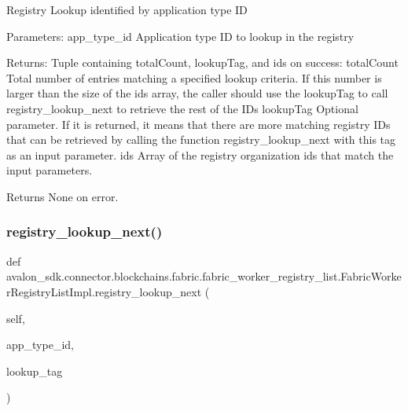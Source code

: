 \begin{DoxyVerb}Registry Lookup identified by application type ID

Parameters:
app_type_id  Application type ID to lookup in the registry

Returns:
Tuple containing totalCount, lookupTag, and ids on success:
totalCount Total number of entries matching a specified lookup
   criteria. If this number is larger than the size of the
   ids array, the caller should use the lookupTag to call
   registry_lookup_next to retrieve the rest of the IDs
lookupTag  Optional parameter. If it is returned, it means that
   there are more matching registry IDs that can be
   retrieved by calling the function registry_lookup_next
   with this tag as an input parameter.
ids        Array of the registry organization ids that match the
   input parameters.

Returns None on error.
\end{DoxyVerb}
 \mbox{\label{classavalon__sdk_1_1connector_1_1blockchains_1_1fabric_1_1fabric__worker__registry__list_1_1FabricWorkerRegistryListImpl_ace64bb5dd5c8a067d11b508475ef7262}} 
\subsubsection{\texorpdfstring{registry\+\_\+lookup\+\_\+next()}{registry\_lookup\_next()}}
{\footnotesize\ttfamily def avalon\+\_\+sdk.\+connector.\+blockchains.\+fabric.\+fabric\+\_\+worker\+\_\+registry\+\_\+list.\+Fabric\+Worker\+Registry\+List\+Impl.\+registry\+\_\+lookup\+\_\+next (\begin{DoxyParamCaption}\item[{}]{self,  }\item[{}]{app\+\_\+type\+\_\+id,  }\item[{}]{lookup\+\_\+tag }\end{DoxyParamCaption})}


